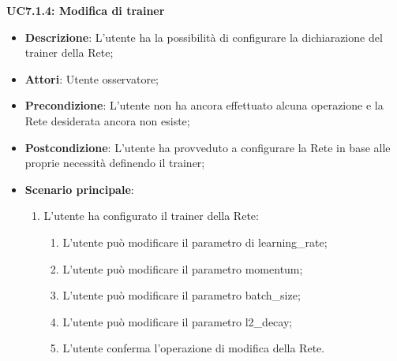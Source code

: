 \textbf{UC7.1.4: Modifica di trainer}
\label{UC7.1.4: Modifica di trainer}
\noindent
\begin{itemize}
\item \textbf{Descrizione}: L'utente ha la possibilit\`a di configurare la dichiarazione del trainer della Rete;
\item \textbf{Attori}: Utente osservatore;
\item \textbf{Precondizione}: L'utente non ha ancora effettuato alcuna operazione e la Rete desiderata ancora non esiste;
\item \textbf{Postcondizione}: L'utente ha provveduto a configurare la Rete in base alle proprie necessit\`a definendo il trainer;
\item \textbf{Scenario principale}:
\begin{enumerate}
\item L'utente ha configurato il trainer della Rete:
\begin{enumerate}
\item L'utente pu\`o modificare il parametro di learning\_rate;
\item L'utente pu\`o modificare il parametro momentum;
\item L'utente pu\`o modificare il parametro batch\_size;
\item L'utente pu\`o modificare il parametro l2\_decay;
\item L'utente conferma l'operazione di modifica della Rete.
\end{enumerate}
\end{enumerate}
\end{itemize}

